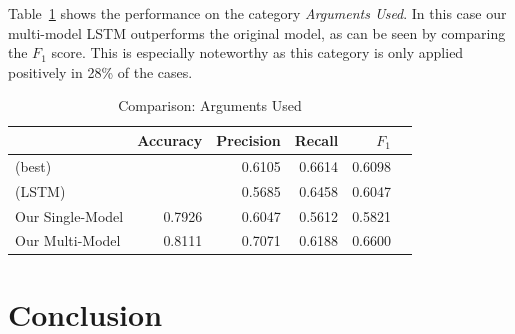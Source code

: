 \documentclass[11pt,a4paper]{article}
\begin{document}
Table~\ref{tab:results:arguments_used} shows the performance on the category \textit{Arguments Used}. In this case our multi-model LSTM outperforms the original model, as can be seen by comparing the $F_1$ score. This is especially noteworthy as this category is only applied positively in 28\% of the cases.  
\begin{table}[h!]
	\centering\tiny
	\begin{tabular}{l r r r r r}
		& Accuracy & Precision & Recall & $F_1$ \\
		\hline
		\cite{Schabus17} (best) & & 0.6105 & 0.6614 & 0.6098 \\
		\cite{Schabus17} (LSTM) & & 0.5685 & 0.6458 & 0.6047\\
		\hline
		Our Single-Model & 0.7926 & 0.6047 & 0.5612 & 0.5821 \\
		Our Multi-Model & 0.8111 & 0.7071 & 0.6188 & 0.6600 \\
	\end{tabular}
	\caption{Comparison: Arguments Used}
	\label{tab:results:arguments_used}
\end{table}


\section{Conclusion}





\appendix

\end{document}
